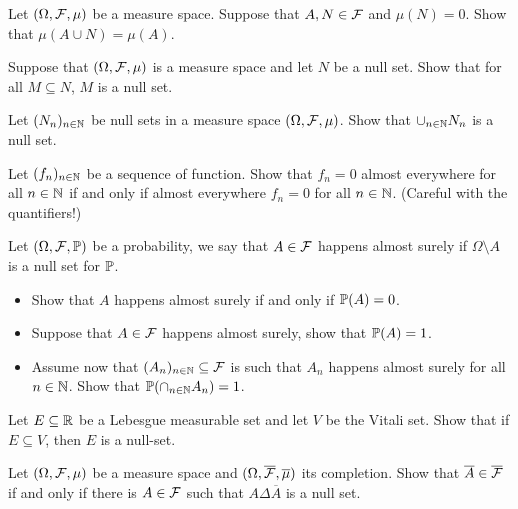 \begin{problem}
    Let $(\Omega,\mathcal F,\mu)$ be a measure space. Suppose that $A,N\in \mathcal F$ and $\mu(N) =0$. Show that $\mu(A\cup N) = \mu(A)$.
\end{problem}

\begin{problem} Suppose that $(\Omega,\mathcal F,\mu)$ is a measure space and let $N$ be a null set. Show that for all $M\subseteq N$, $M$ is a null set.
\end{problem}
    
 \begin{problem}
    Let $(N_n)_{n\in \mathbb N}$ be null sets in a measure space $(\Omega,\mathcal F,\mu)$. Show that $\cup_{n\in \mathbb N} N_n$ is a null set.
\end{problem}

\begin{problem}
    Let $(f_n)_{n\in \mathbb N}$ be a sequence of function. Show that $f_n = 0$ almost everywhere for all $n\in \mathbb N$ if and only if almost everywhere $f_n=0$ for all $n\in \mathbb N$. (Careful with the quantifiers!)
\end{problem}

\begin{problem} Let $(\Omega,\mathcal F,\mathbb P)$ be a probability, we say that $A\in\mathcal F$ happens almost surely if $\Omega\setminus A$ is a null set for $\mathbb P$.
    \begin{itemize}
        \item Show that $A$ happens almost surely if and only if $\mathbb P(A) = 0$.
        \item Suppose that $A\in \mathcal F$ happens almost surely, show that $\mathbb P(A) = 1$.
        \item Assume now that $(A_n)_{n\in \mathbb N}\subseteq \mathcal F$ is such that $A_n$ happens almost surely for all $n\in \mathbb N$. Show that $\mathbb P(\cap_{n\in \mathbb N} A_n) = 1$.
    \end{itemize} 
\end{problem}

\begin{problem}
        Let $E\subseteq \mathbb R$ be a Lebesgue measurable set and let $V$ be the Vitali set. Show that if $E \subseteq V$, then $E$ is a null-set.
\end{problem}

\begin{problem}
    Let $(\Omega,\mathcal F,\mu)$ be a measure space and $(\Omega,\overline{\mathcal F},\overline{\mu})$ its completion. Show that $\overline{A}\in \overline{\mathcal F}$ if and only if there is $A\in \mathcal F$ such that $A\Delta \overline{A}$ is a null set.
\end{problem}

